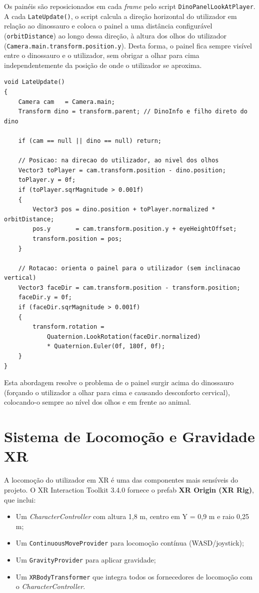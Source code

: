 \documentclass[a4paper,11pt]{report}
\newcommand{\code}[1]{\texttt{#1}}
\begin{document}
Os painéis são reposicionados em cada \textit{frame} pelo script
\code{DinoPanelLookAtPlayer}. A cada \code{LateUpdate()}, o script calcula
a direção horizontal do utilizador em relação ao dinossauro e coloca o painel
a uma distância configurável (\code{orbitDistance}) ao longo dessa direção,
à altura dos olhos do utilizador (\code{Camera.main.transform.position.y}).
Desta forma, o painel fica sempre visível entre o dinossauro e o utilizador,
sem obrigar a olhar para cima independentemente da posição de onde o utilizador
se aproxima.

\begin{lstlisting}[caption={DinoPanelLookAtPlayer.cs --- posicionamento ao nível dos olhos.},
                   label={lst:look}]
void LateUpdate()
{
    Camera cam   = Camera.main;
    Transform dino = transform.parent; // DinoInfo e filho direto do dino

    if (cam == null || dino == null) return;

    // Posicao: na direcao do utilizador, ao nivel dos olhos
    Vector3 toPlayer = cam.transform.position - dino.position;
    toPlayer.y = 0f;
    if (toPlayer.sqrMagnitude > 0.001f)
    {
        Vector3 pos = dino.position + toPlayer.normalized * orbitDistance;
        pos.y       = cam.transform.position.y + eyeHeightOffset;
        transform.position = pos;
    }

    // Rotacao: orienta o painel para o utilizador (sem inclinacao vertical)
    Vector3 faceDir = cam.transform.position - transform.position;
    faceDir.y = 0f;
    if (faceDir.sqrMagnitude > 0.001f)
    {
        transform.rotation =
            Quaternion.LookRotation(faceDir.normalized)
            * Quaternion.Euler(0f, 180f, 0f);
    }
}
\end{lstlisting}

Esta abordagem resolve o problema de o painel surgir acima do dinossauro
(forçando o utilizador a olhar para cima e causando desconforto cervical),
colocando-o sempre ao nível dos olhos e em frente ao animal.

\section{Sistema de Locomoção e Gravidade XR}
\label{sec:locomotion}

A locomoção do utilizador em XR é uma das componentes mais sensíveis do
projeto. O XR Interaction Toolkit 3.4.0 fornece o prefab
\textbf{XR Origin (XR Rig)}, que inclui:

\begin{itemize}
    \setlength\itemsep{0pt}
    \item Um \textit{CharacterController} com altura 1,8 m, centro em Y = 0,9 m
          e raio 0,25 m;
    \item Um \code{ContinuousMoveProvider} para locomoção contínua (WASD/joystick);
    \item Um \code{GravityProvider} para aplicar gravidade;
    \item Um \code{XRBodyTransformer} que integra todos os fornecedores de
          locomoção com o \textit{CharacterController}.
\end{itemize}
\end{document}
